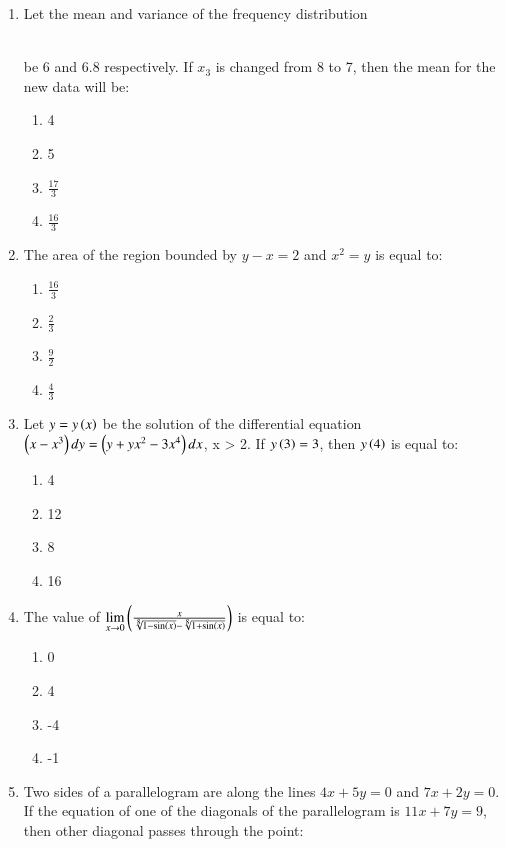 \documentclass[journal]{IEEEtran}
\begin{document}
\begin{enumerate}
 \item Let the mean and variance of the frequency distribution
	 \begin{table}[h!]
		 \centering
		 
		 \end{table}
\\
be 6 and 6.8 respectively. If $x_3$ is changed from 8 to 7, then the mean for the new data will be:
 \begin{enumerate}
     \item 4
     \item 5
     \item $\frac{17}{3}$
     \item $\frac{16}{3}$\\
 \end{enumerate}
\item The area of the region bounded by $y - x = 2$ and $x^2 = y$ is equal to:
\begin{enumerate}
     \item $\frac{16}{3}$
     \item $\frac{2}{3}$
     \item $\frac{9}{2}$
     \item $\frac{4}{3}$\\
 \end{enumerate}
\item Let $y = y\left(x\right)$ be the solution of the differential equation $\left(x - x^3\right)dy = \left(y + yx^2 - 3x^4\right)dx$, x > 2. If $y\left(3\right) = 3$, then $y\left(4\right)$ is equal to:
\begin{enumerate}
    \item 4
    \item 12
    \item 8
    \item 16\\
\end{enumerate}
\item The value of $\lim\limits_{x \rightarrow 0}\left(\frac{x}{\sqrt[8]{1-\sin\left(x\right)} - \sqrt[8]{1+\sin\left(x\right)}}\right)$ is equal to:
\begin{enumerate}
    \item 0
    \item 4
    \item -4
    \item -1\\
\end{enumerate}
\item Two sides of a parallelogram are along the lines $4x + 5y = 0$ and $7x+ 2y = 0$. If the equation of one of the diagonals of the parallelogram is $11x + 7y = 9$, then other diagonal passes through the point:

\end{enumerate}
\end{document}
